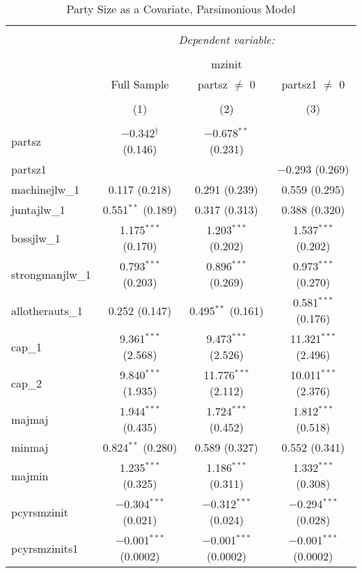 
\begin{table}[!htbp] \centering 
  \caption{Party Size as a Covariate, Parsimonious Model} 
  \label{} 
\begin{tabular}{@{\extracolsep{5pt}}lccc} 
\\[-1.8ex]\hline 
\hline \\[-1.8ex] 
 & \multicolumn{3}{c}{\textit{Dependent variable:}} \\ 
\cline{2-4} 
\\[-1.8ex] & \multicolumn{3}{c}{mzinit} \\ 
 & Full Sample & partsz $\neq$ 0 & partsz1 $\neq$ 0 \\ 
\\[-1.8ex] & (1) & (2) & (3)\\ 
\hline \\[-1.8ex] 
 partsz & $-$0.342$^{\dagger}$ (0.146) & $-$0.678$^{**}$ (0.231) &  \\ 
  partsz1 &  &  & $-$0.293 (0.269) \\ 
  machinejlw\_1 & 0.117 (0.218) & 0.291 (0.239) & 0.559 (0.295) \\ 
  juntajlw\_1 & 0.551$^{**}$ (0.189) & 0.317 (0.313) & 0.388 (0.320) \\ 
  bossjlw\_1 & 1.175$^{***}$ (0.170) & 1.203$^{***}$ (0.202) & 1.537$^{***}$ (0.202) \\ 
  strongmanjlw\_1 & 0.793$^{***}$ (0.203) & 0.896$^{***}$ (0.269) & 0.973$^{***}$ (0.270) \\ 
  allotherauts\_1 & 0.252 (0.147) & 0.495$^{**}$ (0.161) & 0.581$^{***}$ (0.176) \\ 
  cap\_1 & 9.361$^{***}$ (2.568) & 9.473$^{***}$ (2.526) & 11.321$^{***}$ (2.496) \\ 
  cap\_2 & 9.840$^{***}$ (1.935) & 11.776$^{***}$ (2.112) & 10.011$^{***}$ (2.376) \\ 
  majmaj & 1.944$^{***}$ (0.435) & 1.724$^{***}$ (0.452) & 1.812$^{***}$ (0.518) \\ 
  minmaj & 0.824$^{**}$ (0.280) & 0.589 (0.327) & 0.552 (0.341) \\ 
  majmin & 1.235$^{***}$ (0.325) & 1.186$^{***}$ (0.311) & 1.332$^{***}$ (0.308) \\ 
  pcyrsmzinit & $-$0.304$^{***}$ (0.021) & $-$0.312$^{***}$ (0.024) & $-$0.294$^{***}$ (0.028) \\ 
  pcyrsmzinits1 & $-$0.001$^{***}$ (0.0002) & $-$0.001$^{***}$ (0.0002) & $-$0.001$^{***}$ (0.0002) \\ 

\end{tabular}
\end{table}

